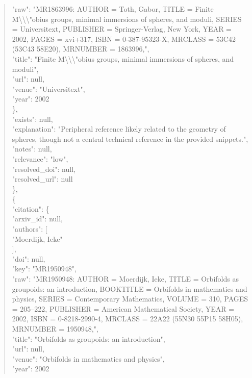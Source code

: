 \documentclass[11pt]{article}
\begin{document}
\begin{quote}
        "raw": "MR1863996: AUTHOR = Toth, Gabor, TITLE = Finite M\textbackslash{}\textbackslash{}\textbackslash{}"obius groups, minimal immersions of spheres, and moduli, SERIES = Universitext, PUBLISHER = Springer-Verlag, New York, YEAR = 2002, PAGES = xvi+317, ISBN = 0-387-95323-X, MRCLASS = 53C42 (53C43 58E20), MRNUMBER = 1863996,",\\
        "title": "Finite M\textbackslash{}\textbackslash{}\textbackslash{}"obius groups, minimal immersions of spheres, and moduli",\\
        "url": null,\\
        "venue": "Universitext",\\
        "year": 2002\\
      \},\\
      "exists": null,\\
      "explanation": "Peripheral reference likely related to the geometry of spheres, though not a central technical reference in the provided snippets.",\\
      "notes": null,\\
      "relevance": "low",\\
      "resolved\_doi": null,\\
      "resolved\_url": null\\
    \},\\
    \{\\
      "citation": \{\\
        "arxiv\_id": null,\\
        "authors": [\\
          "Moerdijk, Ieke"\\
        ],\\
        "doi": null,\\
        "key": "MR1950948",\\
        "raw": "MR1950948: AUTHOR = Moerdijk, Ieke, TITLE = Orbifolds as groupoids: an introduction, BOOKTITLE = Orbifolds in mathematics and physics, SERIES = Contemporary Mathematics, VOLUME = 310, PAGES = 205--222, PUBLISHER = American Mathematical Society, YEAR = 2002, ISBN = 0-8218-2990-4, MRCLASS = 22A22 (55N30 55P15 58H05), MRNUMBER = 1950948,",\\
        "title": "Orbifolds as groupoids: an introduction",\\
        "url": null,\\
        "venue": "Orbifolds in mathematics and physics",\\
        "year": 2002\\

\end{quote}
\end{document}
